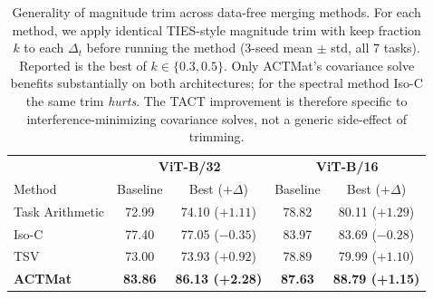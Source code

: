 \begin{table}[h]
\caption{Generality of magnitude trim across data-free merging methods. For each method, we apply identical TIES-style magnitude trim with keep fraction $k$ to each $\Delta_t$ before running the method (3-seed mean $\pm$ std, all 7 tasks). Reported is the best of $k\in\{0.3, 0.5\}$. Only ACTMat's covariance solve benefits substantially on both architectures; for the spectral method Iso-C the same trim \emph{hurts}. The TACT improvement is therefore specific to interference-minimizing covariance solves, not a generic side-effect of trimming.}
\label{tab:trim_other}
\centering
\small
\setlength{\tabcolsep}{4pt}
\begin{tabular}{lcc|cc}
\toprule
 & \multicolumn{2}{c|}{\textbf{ViT-B/32}} & \multicolumn{2}{c}{\textbf{ViT-B/16}} \\
Method & Baseline & Best ($+\Delta$) & Baseline & Best ($+\Delta$) \\
\midrule
Task Arithmetic & 72.99 & 74.10 ($+1.11$) & 78.82 & 80.11 ($+1.29$) \\
Iso-C & 77.40 & 77.05 ($-0.35$) & 83.97 & 83.69 ($-0.28$) \\
TSV & 73.00 & 73.93 ($+0.92$) & 78.89 & 79.99 ($+1.10$) \\
\textbf{ACTMat} & \textbf{83.86} & \textbf{86.13 (+2.28)} & \textbf{87.63} & \textbf{88.79 (+1.15)} \\
\bottomrule
\end{tabular}
\end{table}
